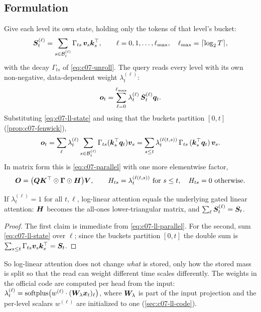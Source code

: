 \subsection{Formulation}\label{sec:c07-ll-formulation}

Give each level its own state, holding only the tokens of that level's bucket:
\begin{equation}\label{eq:c07-ll-state}
  \bm{S}_t^{(\ell)} = \sum_{s \in \mathcal{B}_t^{(\ell)}} \Gamma_{ts}\, \bm{v}_s\bm{k}_s^{\top} ,
  \qquad \ell = 0, 1, \dots, \ell_{\max},\quad \ell_{\max} = \lceil \log_2 T\rceil ,
\end{equation}
with the decay $\Gamma_{ts}$ of \cref{eq:c07-unroll}. The query reads every level with its
own non-negative, data-dependent weight $\lambda_t^{(\ell)}$:
\begin{equation}\label{eq:c07-ll-out}
  \bm{o}_t = \sum_{\ell=0}^{\ell_{\max}} \lambda_t^{(\ell)}\, \bm{S}_t^{(\ell)} \bm{q}_t .
\end{equation}
Substituting \cref{eq:c07-ll-state} and using that the buckets partition $[0,t]$
(\cref{prop:c07-fenwick}),
\[
  \bm{o}_t = \sum_{\ell} \lambda_t^{(\ell)} \sum_{s \in \mathcal{B}_t^{(\ell)}} \Gamma_{ts}(\bm{k}_s^{\top}\bm{q}_t)\bm{v}_s
        = \sum_{s \le t} \lambda_t^{(\ell(t,s))}\, \Gamma_{ts}\, (\bm{k}_s^{\top}\bm{q}_t)\, \bm{v}_s .
\]
In matrix form this is \cref{eq:c07-parallel} with one more elementwise factor,
\begin{equation}\label{eq:c07-ll-parallel}
  \bm{O} = \bigl(\bm{Q}\bm{K}^{\top} \odot \bm{\Gamma} \odot \bm{H}\bigr)\bm{V},
  \qquad H_{ts} = \lambda_t^{(\ell(t,s))} \text{ for } s \le t,\quad H_{ts} = 0 \text{ otherwise}.
\end{equation}

\begin{proposition}\label{prop:c07-ll-reduce}
If $\lambda_t^{(\ell)} = 1$ for all $t,\ell$, log-linear attention equals the underlying gated
linear attention: $\bm{H}$ becomes the all-ones lower-triangular matrix, and
$\sum_\ell \bm{S}_t^{(\ell)} = \bm{S}_t$.
\end{proposition}
\begin{proof}
The first claim is immediate from \cref{eq:c07-ll-parallel}. For the second, sum
\cref{eq:c07-ll-state} over $\ell$; since the buckets partition $[0,t]$ the double sum is
$\sum_{s\le t}\Gamma_{ts}\bm{v}_s\bm{k}_s^{\top} = \bm{S}_t$.
\end{proof}

So log-linear attention does not change \emph{what} is stored, only how the stored mass is
split so that the read can weight different time scales differently. The weights in the
official code are computed per head from the input:
$\lambda_t^{(\ell)} = \operatorname{softplus}\bigl(w^{(\ell)} \cdot (\bm{W}_\lambda \bm{x}_t)_\ell\bigr)$,
where $\bm{W}_\lambda$ is part of the input projection and the per-level scalars $w^{(\ell)}$ are
initialized to one (\cref{sec:c07-ll-code}).

